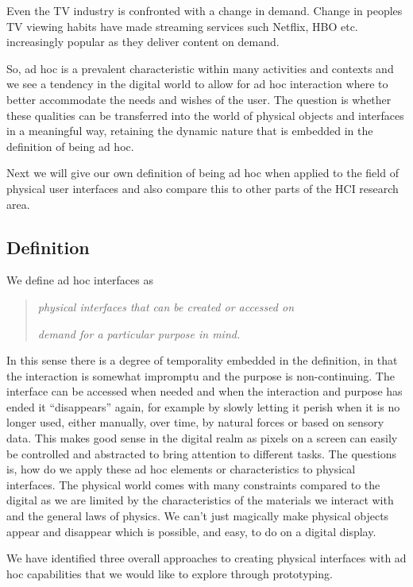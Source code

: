 Even the TV industry is confronted with a change in demand.
Change in peoples TV viewing habits have made streaming services such Netflix, HBO etc. increasingly popular as they deliver content on demand.

So, ad hoc is a prevalent characteristic within many activities and contexts and we see a tendency in the digital world to allow for ad hoc interaction where to better accommodate the needs and wishes of the user.
The question is whether these qualities can be transferred into the world of physical objects and interfaces in a meaningful way, retaining the dynamic nature that is embedded in the definition of being ad hoc.

Next we will give our own definition of being ad hoc when applied to the field of physical user interfaces and also compare this to other parts of the HCI research area.

\subsection{Definition} 
We define ad hoc interfaces as 

\begin{quotation}\label{adhoc:definition}
\emph{physical interfaces that can be created or accessed on} 

\emph{demand for a particular purpose in mind. }
\end{quotation}

In this sense there is a degree of temporality embedded in the definition, in that the interaction is somewhat impromptu and the purpose is non-continuing.
The interface can be accessed when needed and when the interaction and purpose has ended it ``disappears'' again, for example by slowly letting it perish when it is no longer used, either manually, over time, by natural forces or based on sensory data.
This makes good sense in the digital realm as pixels on a screen can easily be controlled and abstracted to bring attention to different tasks.
The questions is, how do we apply these ad hoc elements or characteristics to physical interfaces.
The physical world comes with many constraints compared to the digital as we are limited by the characteristics of the materials we interact with and the general laws of physics.
We can't just magically make physical objects appear and disappear which is possible, and easy, to do on a digital display.


We have identified three overall approaches to creating physical interfaces with ad hoc capabilities that we would like to explore through prototyping.

